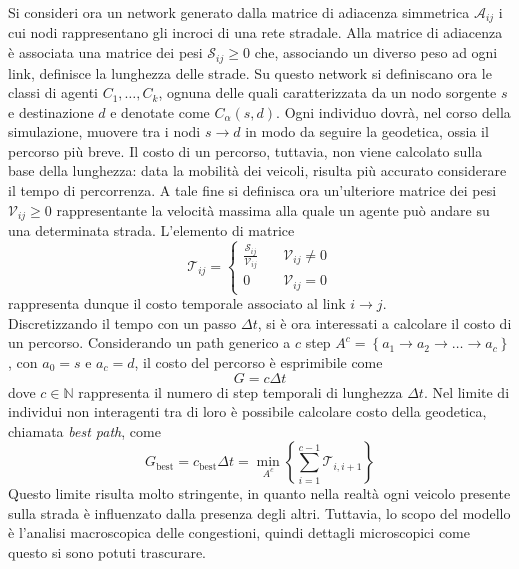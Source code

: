 Si consideri ora un network generato dalla matrice di adiacenza simmetrica $\mathcal{A}_{ij}$ i cui nodi rappresentano gli incroci di una rete stradale.
Alla matrice di adiacenza \`e associata una matrice dei pesi $\mathcal{S}_{ij} \geq 0$ che, associando un diverso peso ad ogni link, definisce la lunghezza delle strade.
Su questo network si definiscano ora le classi di agenti $C_{1},\ldots,C_{k}$, ognuna delle quali caratterizzata da un nodo sorgente $s$ e destinazione $d$ e denotate come $C_{\alpha}(s,d)$.
Ogni individuo dovr\`a, nel corso della simulazione, muovere tra i nodi $s\to d$ in modo da seguire la geodetica, ossia il percorso pi\`u breve.
Il costo di un percorso, tuttavia, non viene calcolato sulla base della lunghezza: data la mobilit\`a dei veicoli, risulta pi\`u accurato considerare il tempo di percorrenza.
A tale fine si definisca ora un'ulteriore matrice dei pesi $\mathcal{V}_{ij} \geq 0$ rappresentante la velocit\`a massima alla quale un agente pu\`o andare su una determinata strada.
L'elemento di matrice
\begin{equation}
    \mathcal{T}_{ij}=
    \begin{cases}
        \frac{\mathcal{S}_{ij}}{\mathcal{V}_{ij}} \quad& \mathcal{V}_{ij} \neq 0\\
        0 \quad& \mathcal{V}_{ij} = 0
    \end{cases}
\end{equation}
rappresenta dunque il costo temporale associato al link $i \to j$.\\
Discretizzando il tempo con un passo $\Delta t$, si \`e ora interessati a calcolare il costo di un percorso.
Considerando un path generico a $c$ step $A^{c} = \left\{a_{1} \to a_{2} \to \ldots \to a_{c}\right\}$, con $a_{0} = s$ e $a_{c} = d$, il costo del percorso \`e esprimibile come
\begin{equation}
    G=c\Delta t
\end{equation}
dove $c \in \mathbb{N}$ rappresenta il numero di step temporali di lunghezza $\Delta t$.
Nel limite di individui non interagenti tra di loro \`e possibile calcolare costo della geodetica, chiamata \emph{best path}, come
\begin{equation}
    G_{\text{best}} = c_{\text{best}}\Delta t = \min_{A^{c}} \left\{\sum_{i=1}^{c-1}\mathcal{T}_{i,i+1}\right\}
    \label{eq:best_path}
\end{equation}
Questo limite risulta molto stringente, in quanto nella realt\`a ogni veicolo presente sulla strada \`e influenzato dalla presenza degli altri.
Tuttavia, lo scopo del modello \`e l'analisi macroscopica delle congestioni, quindi dettagli microscopici come questo si sono potuti trascurare.
